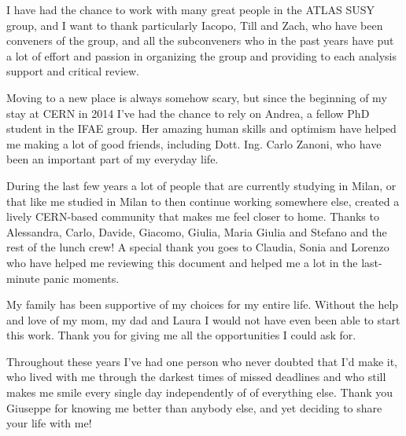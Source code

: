 \par\bigskip
I have had the chance to work with many great people in the ATLAS SUSY group, and 
I want to thank particularly Iacopo, Till and Zach, who have been conveners of the group,
and all the subconveners who in the past years 
have put a lot of effort and passion in organizing the group and providing to each 
analysis support and critical review. 

\par\bigskip 
Moving to a new place is always somehow scary, but since the beginning of my 
stay at CERN in 2014 I've had the chance to rely on Andrea, a fellow PhD student in the 
IFAE group. 
Her amazing human skills and optimism have helped me making a lot of good friends, including Dott. Ing. 
Carlo Zanoni, who have been an important part of my everyday life. 

\par\bigskip

During the last few years a lot of people that are currently studying in Milan, or that like me 
studied in Milan to then continue working somewhere else, created a lively CERN-based community that 
makes me feel closer to home. 
Thanks to Alessandra, Carlo, Davide, Giacomo, Giulia, Maria Giulia and Stefano and the rest of the 
lunch crew! A special thank you goes to Claudia, Sonia and Lorenzo who have helped me reviewing this document and 
helped me a lot in the last-minute panic moments. 

\par\bigskip 
My family has been supportive of my choices for my entire life. 
Without the help and love of my mom, my dad and Laura I would not have even been able to start this work. 
Thank you for giving me all the opportunities I could ask for. 

\par\bigskip 
Throughout these years I've had one person who never doubted that I'd make it, 
who lived with me through the darkest times of missed deadlines 
and who still makes me smile every single day independently 
of of everything else. 
Thank you Giuseppe for knowing me better than anybody else, 
and yet deciding to share your life with me! 


